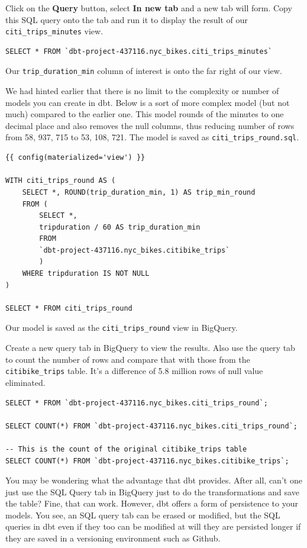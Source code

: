 \documentclass[
]{book}
\begin{document}
Click on the \textbf{Query} button, select \textbf{In new tab} and a new tab will form. Copy this SQL query onto the tab and run it to display the result of our \texttt{citi\_trips\_minutes} view.

\begin{verbatim}
SELECT * FROM `dbt-project-437116.nyc_bikes.citi_trips_minutes` 
\end{verbatim}

Our \texttt{trip\_duration\_min} column of interest is onto the far right of our view.

We had hinted earlier that there is no limit to the complexity or number of models you can create in dbt. Below is a sort of more complex model (but not much) compared to the earlier one. This model rounds of the minutes to one decimal place and also removes the null columns, thus reducing number of rows from 58, 937, 715 to 53, 108, 721. The model is saved as \texttt{citi\_trips\_round.sql}.

\begin{verbatim}
{{ config(materialized='view') }}

WITH citi_trips_round AS (
    SELECT *, ROUND(trip_duration_min, 1) AS trip_min_round
    FROM (
        SELECT *, 
        tripduration / 60 AS trip_duration_min
        FROM 
        `dbt-project-437116.nyc_bikes.citibike_trips`
        ) 
    WHERE tripduration IS NOT NULL
)

SELECT * FROM citi_trips_round
\end{verbatim}

Our model is saved as the \texttt{citi\_trips\_round} view in BigQuery.

Create a new query tab in BigQuery to view the results. Also use the query tab to count the number of rows and compare that with those from the \texttt{citibike\_trips} table. It's a difference of 5.8 million rows of null value eliminated.

\begin{verbatim}
SELECT * FROM `dbt-project-437116.nyc_bikes.citi_trips_round`; 

SELECT COUNT(*) FROM `dbt-project-437116.nyc_bikes.citi_trips_round`;

-- This is the count of the original citibike_trips table
SELECT COUNT(*) FROM `dbt-project-437116.nyc_bikes.citibike_trips`;
\end{verbatim}

You may be wondering what the advantage that dbt provides. After all, can't one just use the SQL Query tab in BigQuery just to do the transformations and save the table? Fine, that can work. However, dbt offers a form of persistence to your models. You see, an SQL query tab can be erased or modified, but the SQL queries in dbt even if they too can be modified at will they are persisted longer if they are saved in a versioning environment such as Github.
\end{document}

